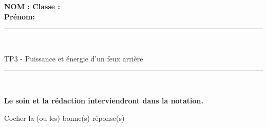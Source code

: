 \documentclass[11pt,a4paper]{article}
\begin{document}
\flushleft \textbf{NOM : \hfill Classe : \hspace{3cm} ~~\\[2mm]
Prénom:\\[0,4cm]
}
\hrule\
\\[0,2cm]

\begin{center}
 \LARGE{TP3 - Puissance et énergie d'un feux arrière}
\end{center}

\vspace{3 mm}

\normalsize

\hrule\
\\[0,2cm]
   \begin{center}
   \textbf{Le soin et la rédaction interviendront dans la notation.}
   \end{center} 

 Cocher la (ou les) bonne(s) réponse(s) \\
\end{document}
